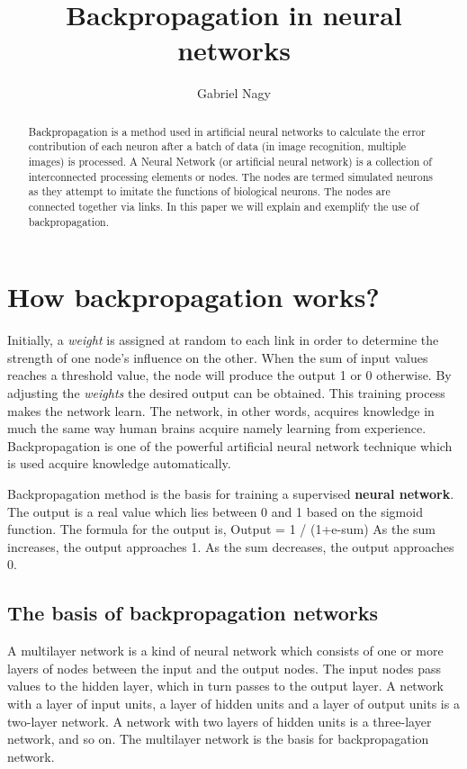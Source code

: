 \documentclass[a4paper]{article}
\title{Backpropagation in neural networks}
\author{Gabriel Nagy}
\begin{document}
\maketitle

\begin{abstract}
Backpropagation is a method used in artificial neural networks to calculate the error contribution of each neuron after a batch of data (in image recognition, multiple images) is processed. A Neural Network (or artificial neural network) is a collection of interconnected processing elements or nodes. The nodes are termed simulated neurons as they attempt to imitate the functions of biological neurons. The nodes are connected together via links. In this paper we will explain and exemplify the use of backpropagation.
\end{abstract}

\section{How backpropagation works?
}

Initially, a \textit{weight} is assigned at random to each link in order to determine the strength of one node’s influence on the other. When the sum of input values reaches a threshold value, the node will produce the output 1 or 0 otherwise. By adjusting the \textit{weights} the desired output can be obtained. This training process makes the network learn. The network, in other words, acquires knowledge in much the same way human brains acquire namely learning from experience. Backpropagation is one of the powerful artificial neural network technique which is used acquire knowledge automatically.

Backpropagation method is the basis for training a supervised \textbf{neural network}. The output is a real value which lies between 0 and 1 based on the sigmoid function. The formula for the output is,
Output = 1 / (1+e-sum)
As the sum increases, the output approaches 1. As the sum decreases, the output approaches 0.

\subsection{The basis of backpropagation networks}
A multilayer network is a kind of neural network which consists of one or more layers of nodes between the input and the output nodes. The input nodes pass values to the hidden layer, which in turn passes to the output layer. A network with a layer of input units, a layer of hidden units and a layer of output units is a two-layer network. A network with two layers of hidden units is a three-layer network, and so on. The multilayer network is the basis for backpropagation network.
\end{document}
